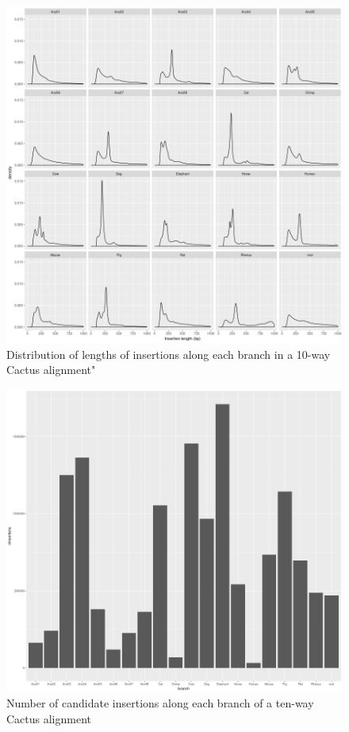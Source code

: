 \documentclass{article}
\begin{document}
\begin{figure}[h]
  \includegraphics[width=\textwidth]{figures/insertion_lengths_normalized}
  \caption{Distribution of lengths of insertions along each branch in a 10-way Cactus alignment"}
  \label{fig:insertion_length_dist}
\end{figure}

\begin{figure}[h]
  \includegraphics[width=\textwidth]{figures/nInsertionsPerBranch}
  \caption{Number of candidate insertions along each branch of a ten-way Cactus alignment}
  \label{fig:number_of_insertions}
\end{figure}
\end{document}
